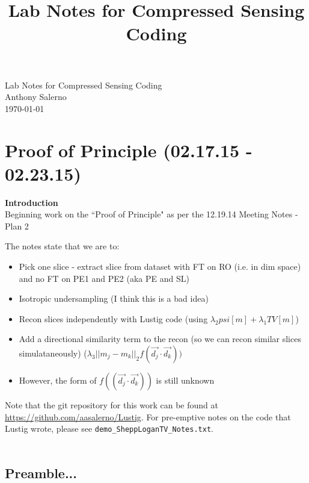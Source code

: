 \documentclass[11 pt]{article}
\title{Lab Notes for Compressed Sensing Coding}
\newcommand{\bo}{\noindent\textbf}
\let\oldsection\section
\renewcommand\section{\clearpage\newpage\oldsection}
\begin{document}
\vfill

  \begin{titlepage}
    \vspace*{\fill}
    \begin{center}
      {\huge {Lab Notes for Compressed Sensing Coding}}\\[0.5cm]
      {\large {Anthony Salerno}}\\[0.4cm]
      \today
    \end{center}
    \vspace*{\fill}
  \end{titlepage}

\clearpage
\newpage

\tableofcontents

\newpage

\section{Proof of Principle (02.17.15 - 02.23.15)}

\bo{Introduction}\\
Beginning work on the ``Proof of Principle" as per the 12.19.14 Meeting Notes - Plan 2

The notes state that we are to:
\begin{itemize}
  \item Pick one slice - extract slice from dataset with FT on RO (i.e. in dim space) and no FT on PE1 and PE2 (aka PE and SL)
  \item Isotropic undersampling (I think this is a bad idea)
  \item Recon slices independently with Lustig code (using $\lambda_2 psi[m] + \lambda_1 TV[m]$)
  \item Add a directional similarity term to the recon (so we can recon similar slices simulataneously) ($\lambda_3 ||m_j - m_k||_2 f(\vec{d_j} \cdot \vec{d_k}))$
  \item However, the form of $f((\vec{d_j}\cdot \vec{d_k}))$ is still unknown
\end{itemize}

\noindent Note that the git repository for this work can be found at \url{https://github.com/aasalerno/Lustig}. For pre-emptive notes on the code that Lustig wrote, please see \verb!demo_SheppLoganTV_Notes.txt!. \\ \\

\subsection{Preamble...}
\end{document}
